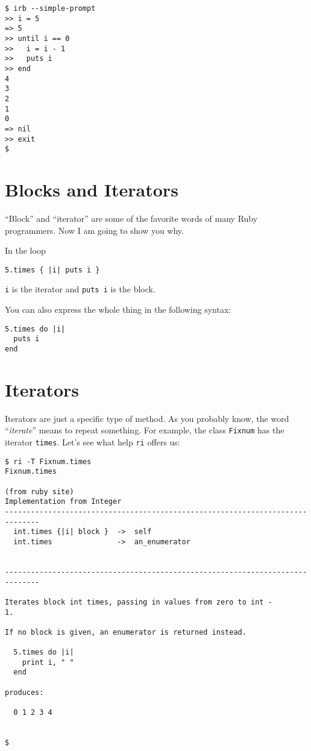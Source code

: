 \documentclass[a4paper]{book}
\begin{document}
\begin{shaded}\begin{verbatim}
$ irb --simple-prompt
>> i = 5
=> 5
>> until i == 0
>>   i = i - 1
>>   puts i
>> end
4
3
2
1
0
=> nil
>> exit
$
\end{verbatim}\end{shaded}

\section{Blocks and Iterators}\label{blocks-and-iterators}

“Block” and “iterator” are some of the favorite words of many Ruby programmers. Now I am going to show you why.

In the loop

\begin{shaded}\begin{verbatim}
5.times { |i| puts i }
\end{verbatim}\end{shaded}

\texttt{i} is the iterator and \texttt{puts i} is the block.

You can also express the whole thing in the following syntax:

\begin{shaded}\begin{verbatim}
5.times do |i|
  puts i
end
\end{verbatim}\end{shaded}

\section{Iterators}\label{iterators}

Iterators are just a specific type of method. As you probably know, the word “\emph{iterate}” means to repeat something. For example, the class \texttt{Fixnum} has the iterator \texttt{times}. Let's see what help \texttt{ri} offers us:

\begin{shaded}\begin{verbatim}
$ ri -T Fixnum.times
Fixnum.times

(from ruby site)
Implementation from Integer
------------------------------------------------------------------------------
  int.times {|i| block }  ->  self
  int.times               ->  an_enumerator


------------------------------------------------------------------------------

Iterates block int times, passing in values from zero to int -
1.

If no block is given, an enumerator is returned instead.

  5.times do |i|
    print i, " "
  end

produces:

  0 1 2 3 4


$
\end{verbatim}\end{shaded}
\end{document}
